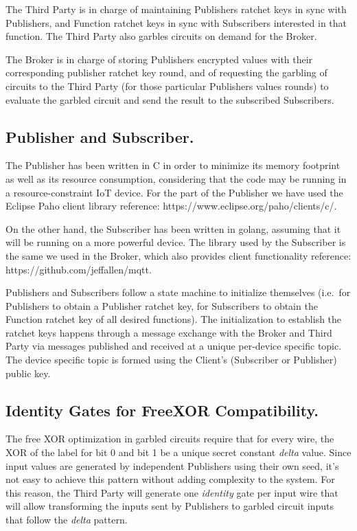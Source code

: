 The Third Party is in charge of maintaining Publishers ratchet keys in sync
with Publishers, and Function ratchet keys in sync with Subscribers interested
in that function.  The Third Party also garbles circuits on demand for the
Broker.

The Broker is in charge of storing Publishers encrypted values with their
corresponding publisher ratchet key round, and of requesting the garbling of
circuits to the Third Party (for those particular Publishers values rounds) to
evaluate the garbled circuit and send the result to the subscribed Subscribers.

\subsection{Publisher and Subscriber.}

The Publisher has been written in C in order to minimize its memory footprint
as well as its resource consumption, considering that the code may be running
in a resource-constraint IoT device.  For the \MQTT{} part of the Publisher we
have used the Eclipse Paho client library {reference:
https://www.eclipse.org/paho/clients/c/}.


On the other hand, the Subscriber has been written in golang, assuming that it
will be running on a more powerful device.  The \MQTT{} library used by the
Subscriber is the same we used in the Broker, which also provides client
functionality {reference: https://github.com/jeffallen/mqtt}.

Publishers and Subscribers follow a state machine to initialize themselves
(i.e.\ for Publishers to obtain a Publisher ratchet key, for Subscribers to
obtain the Function ratchet key of all desired functions).  The initialization
to establish the ratchet keys happens through a message exchange with the
Broker and Third Party via \MQTT{} messages published and received at a unique
per-device specific topic.  The device specific topic is formed using the
Client's (Subscriber or Publisher) public key.

\subsection{Identity Gates for FreeXOR Compatibility.}

The free XOR optimization in garbled circuits require that for every wire, the
XOR of the label for bit 0 and bit 1 be a unique secret constant \emph{delta}
value.  Since input values are generated by independent Publishers using their
own seed, it's not easy to achieve this pattern without adding complexity to
the system.  For this reason, the Third Party will generate one \emph{identity}
gate per input wire that will allow transforming the inputs sent by Publishers
to garbled circuit inputs that follow the \emph{delta} pattern.

